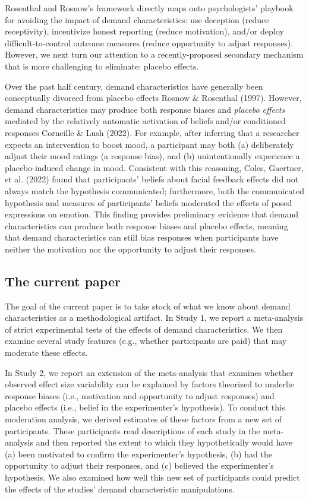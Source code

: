 \documentclass[
  man,floatsintext]{apa6}
\begin{document}
Rosenthal and Rosnow's framework directly maps onto psychologists' playbook for avoiding the impact of demand characteristics: use deception (reduce receptivity), incentivize honest reporting (reduce motivation), and/or deploy difficult-to-control outcome measures (reduce opportunity to adjust responses). However, we next turn our attention to a recently-proposed secondary mechanism that is more challenging to eliminate: placebo effects.

Over the past half century, demand characteristics have generally been conceptually divorced from placebo effects Rosnow \& Rosenthal (1997). However, demand characteristics may produce both response biases and \emph{placebo effects} mediated by the relatively automatic activation of beliefs and/or conditioned responses Corneille \& Lush (2022). For example, after inferring that a researcher expects an intervention to boost mood, a participant may both (a) deliberately adjust their mood ratings (a response bias), and (b) unintentionally experience a placebo-induced change in mood. Consistent with this reasoning, Coles, Gaertner, et al. (2022) found that participants' beliefs about facial feedback effects did not always match the hypothesis communicated; furthermore, both the communicated hypothesis and measures of participants' beliefs moderated the effects of posed expressions on emotion. This finding provides preliminary evidence that demand characteristics can produce both response biases and placebo effects, meaning that demand characteristics can still bias responses when participants have neither the motivation nor the opportunity to adjust their responses.

\hypertarget{the-current-paper}{%
\subsection{The current paper}\label{the-current-paper}}

The goal of the current paper is to take stock of what we know about demand characteristics as a methodological artifact. In Study 1, we report a meta-analysis of strict experimental tests of the effects of demand characteristics. We then examine several study features (e.g., whether participants are paid) that may moderate these effects.

In Study 2, we report an extension of the meta-analysis that examines whether observed effect size variability can be explained by factors theorized to underlie response biases (i.e., motivation and opportunity to adjust responses) and placebo effects (i.e., belief in the experimenter's hypothesis). To conduct this moderation analysis, we derived estimates of these factors from a new set of participants. These participants read descriptions of each study in the meta-analysis and then reported the extent to which they hypothetically would have (a) been motivated to confirm the experimenter's hypothesis, (b) had the opportunity to adjust their responses, and (c) believed the experimenter's hypothesis. We also examined how well this new set of participants could predict the effects of the studies' demand characteristic manipulations.
\end{document}
